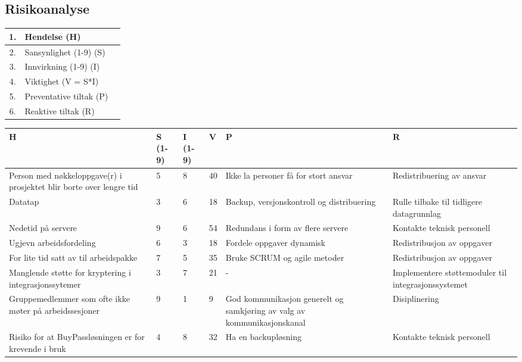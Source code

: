 \subsection{Risikoanalyse}

\begin{tabular}{c l l}
  1. & Hendelse (H)\\ \hline
  2. & Sansynlighet (1-9) (S) \\
  3. & Innvirkning (1-9) (I) \\
  4. & Viktighet (V = S*I) \\
  5. & Preventative tiltak (P) \\
  6. & Reaktive tiltak (R) \\
\end{tabular}

\begin{tabular}{|p{}|p{}|p{}|p{}|p{}|p{}|} \hline
    H & S (1-9) & I (1-9) & V & P & R \\ \hline
    Person med nøkkeloppgave(r) i prosjektet blir borte over lengre tid & 5 & 8 & 40 & Ikke la personer få for stort ansvar & Redistribuering av ansvar \\ \hline
    Datatap & 3 & 6 & 18 & Backup, versjonskontroll og distribuering & Rulle tilbake til tidligere datagrunnlag \\ \hline
    Nedetid på servere & 9 & 6 & 54 & Redundans i form av flere servere & Kontakte teknisk personell \\ \hline
    Ugjevn arbeidsfordeling & 6 & 3 & 18 & Fordele oppgaver dynamisk & Redistribusjon av oppgaver \\ \hline
    For lite tid satt av til arbeidspakke & 7 & 5 & 35 & Bruke SCRUM og agile metoder & Redistribusjon av oppgaver \\ \hline
    Manglende støtte for kryptering i integrasjonssytemer & 3 & 7 & 21 & - & Implementere støttemoduler til integrasjonssystemet \\ \hline
    Gruppemedlemmer som ofte ikke møter på arbeidssesjoner & 9 & 1 & 9 & God kommunikasjon generelt og samkjøring av valg av kommunikasjonskanal & Disiplinering \\ \hline
    Risiko for at BuyPassløsningen er for krevende i bruk & 4 & 8 & 32 & Ha en backupløsning & Kontakte teknisk personell \\ \hline
\end{tabular}



